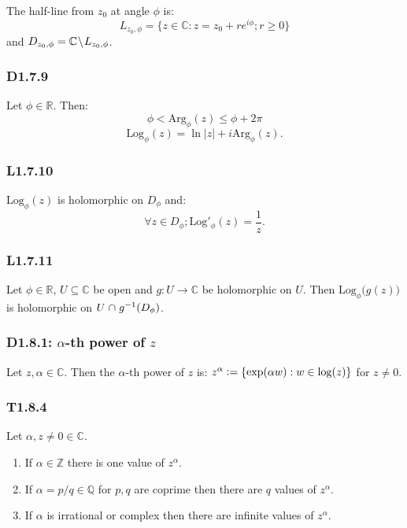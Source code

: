 \documentclass{article}
\newcommand{\deq}{\vcentcolon=}
\begin{document}
\begin{multicols*}{3}
The half-line from $z_0$ at angle $\phi$ is:
$$L_{z_0,\phi}=\{z\in\mathbb{C}:z=z_0+re^{i\phi};r\geq0\}$$
and $D_{z_0,\phi}=\mathbb{C}
\hspace{0.01in}\backslash\hspace{0.01in}L_{z_0,\phi}$.

\subsubsection*{D1.7.9}
Let $\phi\in\mathbb{R}$. Then:
$$\phi<\text{Arg}_{\phi}(z)\leq\phi+2\pi$$
$$\text{Log}_{\phi}(z)=\ln|z|+i\text{Arg}_{\phi}(z).$$

\subsubsection*{L1.7.10}
$\text{Log}_{\phi}(z)$
is holomorphic on $D_{\phi}$ and: 
$$\forall z\in D_{\phi};
\text{Log}'_{\phi}(z)=\frac{1}{z}.$$

\subsubsection*{L1.7.11}
Let $\phi\in\mathbb{R}$, $U\subseteq\mathbb{C}$ be open
and $g:U\rightarrow\mathbb{C}$ be holomorphic on $U$.
Then $\text{Log}_{\phi}\bigl(g(z)\bigr)$ is holomorphic
on $U\hspace{0.01in}\cap\hspace{0.01in}g^{-1}(D_{\phi})$.

\subsubsection*{D1.8.1: $\alpha$-th power of $z$}
Let $z,\alpha\in\mathbb{C}$. Then the $\alpha$-th power of $z$ is:
$z^{\alpha}\deq\{\exp(\alpha w):w\in\log(z)\}$ for $z\neq0$.

\subsubsection*{T1.8.4}
Let $\alpha,z\neq0\in\mathbb{C}$.
\begin{enumerate}
    \item If $\alpha\in\mathbb{Z}$ there is
    one value of $z^{\alpha}$.

    \item If $\alpha=p/q\in\mathbb{Q}$ for $p,q$ are coprime
    then there are $q$ values of $z^{\alpha}$.

    \item If $\alpha$ is irrational or complex
    then there are infinite values of $z^{\alpha}$.
\end{enumerate}


\end{multicols*}
\end{document}
